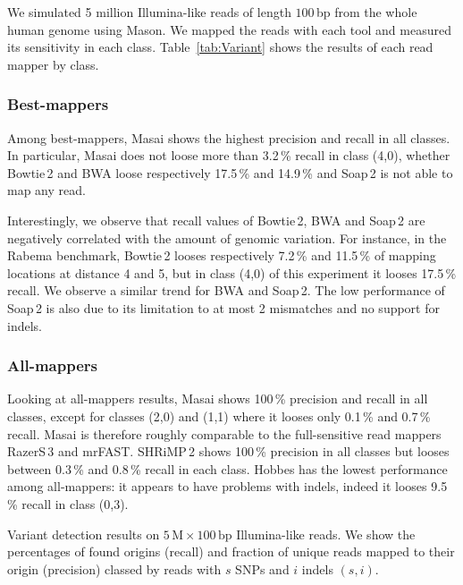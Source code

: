 We simulated 5 million Illumina-like reads of length $100$\,bp from the whole human genome using Mason.
We mapped the reads with each tool and measured its sensitivity in each class.
Table~\ref{tab:Variant} shows the results of each read mapper by class.

\subsubsection{Best-mappers}

Among best-mappers, Masai shows the highest precision and recall in all classes.
In particular, Masai does not loose more than 3.2\,\% recall in class (4,0), whether Bowtie\,2 and BWA loose respectively 17.5\,\% and 14.9\,\% and Soap\,2 is not able to map any read.

Interestingly, we observe that recall values of Bowtie\,2, BWA and Soap\,2 are negatively correlated with the amount of genomic variation.
For instance, in the Rabema benchmark, Bowtie\,2 looses respectively 7.2\,\% and 11.5\,\% of mapping locations at distance 4 and 5, but in class (4,0) of this experiment it looses 17.5\,\% recall.
We observe a similar trend for BWA and Soap\,2.
The low performance of Soap\,2 is also due to its limitation to at most 2 mismatches and no support for indels.

\subsubsection{All-mappers}

Looking at all-mappers results, Masai shows 100\,\% precision and recall in all classes, except for classes (2,0) and (1,1) where it looses only 0.1\,\% and 0.7\,\% recall.
Masai is therefore roughly comparable to the full-sensitive read mappers RazerS\,3 and mrFAST.
SHRiMP\,2 shows 100\,\% precision in all classes but looses between 0.3\,\% and 0.8\,\% recall in each class.
Hobbes has the lowest performance among all-mappers: it appears to have problems with indels, indeed it looses 9.5\,\% recall in class (0,3).

\begin{table*}[tH!]
  \caption[Masai variant detection results]
  {
  \label{tab:Variant}
    Variant detection results on $5\,\text{M}\times 100\,\text{bp}$ Illumina-like reads.
    We show the percentages of found origins (recall) and fraction of unique reads mapped to their origin (precision) classed by reads with $s$ SNPs and $i$ indels $(s,i)$.
  }
  \vspace{-3mm}
  \center
  \sffamily
  \resizebox{0.8\textwidth}{!}
  {
	\renewcommand{\tabcolsep}{0.8ex}
	
  }
\end{table*}

